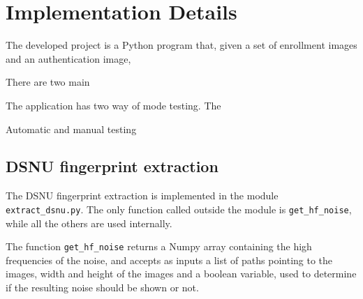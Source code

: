 \chapter{Implementation Details}
The developed project is a Python program that, given a set of enrollment images and an authentication image,

There are two main

The application has two way of mode testing. The

Automatic and manual testing
\section{DSNU fingerprint extraction}\label{sec:dsnu_extraction}
The DSNU fingerprint extraction is implemented in the module \texttt{extract\_dsnu.py}. The only function called outside the module is \texttt{get\_hf\_noise}, while all the others are used internally.

The function \texttt{get\_hf\_noise} returns a Numpy array containing the high frequencies of the noise, and accepts as inputs a list of paths pointing to the images, width and height of the images and a boolean variable, used to determine if the resulting noise should be shown or not.

